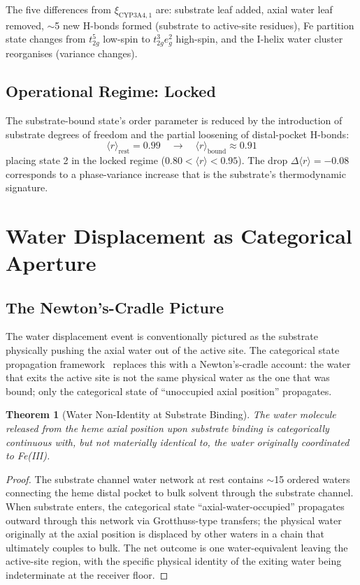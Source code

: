 \documentclass[11pt,twocolumn,a4paper]{article}
\newtheorem{theorem}{Theorem}[section]
\theoremstyle{definition}
\theoremstyle{remark}
\newcommand{\Sexp}{\xi}
\newcommand{\orderpar}{\langle r \rangle}
\begin{document}
The five differences from $\Sexp_{\mathrm{CYP3A4,1}}$ are: substrate leaf added, axial water leaf removed, $\sim$5 new H-bonds formed (substrate to active-site residues), Fe partition state changes from $t_{2g}^5$ low-spin to $t_{2g}^3 e_g^2$ high-spin, and the I-helix water cluster reorganises (variance changes).

\subsection{Operational Regime: Locked}

The substrate-bound state's order parameter is reduced by the introduction of substrate degrees of freedom and the partial loosening of distal-pocket H-bonds:
\begin{equation}
\orderpar_{\mathrm{rest}} = 0.99 \quad\to\quad \orderpar_{\mathrm{bound}} \approx 0.91
\end{equation}
placing state 2 in the locked regime ($0.80 < \orderpar < 0.95$). The drop $\Delta\orderpar = -0.08$ corresponds to a phase-variance increase that is the substrate's thermodynamic signature.

\section{Water Displacement as Categorical Aperture}
\label{sec:water_displacement}

\subsection{The Newton's-Cradle Picture}

The water displacement event is conventionally pictured as the substrate physically pushing the axial water out of the active site. The categorical state propagation framework~\citep{sachikonye2025_flux} replaces this with a Newton's-cradle account: the water that exits the active site is not the same physical water as the one that was bound; only the categorical state of ``unoccupied axial position'' propagates.

\begin{theorem}[Water Non-Identity at Substrate Binding]
\label{thm:water_nonidentity}
The water molecule released from the heme axial position upon substrate binding is categorically continuous with, but not materially identical to, the water originally coordinated to Fe(III).
\end{theorem}

\begin{proof}
The substrate channel water network at rest contains $\sim$15 ordered waters connecting the heme distal pocket to bulk solvent through the substrate channel. When substrate enters, the categorical state ``axial-water-occupied'' propagates outward through this network via Grotthuss-type transfers; the physical water originally at the axial position is displaced by other waters in a chain that ultimately couples to bulk. The net outcome is one water-equivalent leaving the active-site region, with the specific physical identity of the exiting water being indeterminate at the receiver floor.
\end{proof}
\end{document}
